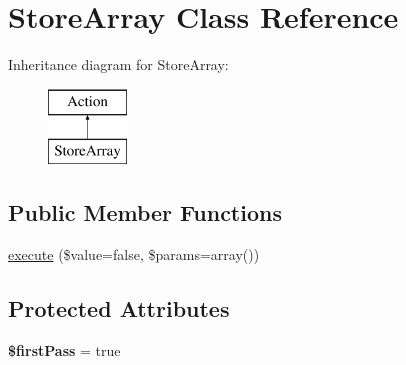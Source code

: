 \hypertarget{class_p_e_a_r2_1_1_console_1_1_command_line_1_1_action_1_1_store_array}{
\section{\-Store\-Array \-Class \-Reference}
\label{class_p_e_a_r2_1_1_console_1_1_command_line_1_1_action_1_1_store_array}
}
\-Inheritance diagram for \-Store\-Array\-:\begin{figure}[H]
\begin{center}
\leavevmode
\includegraphics[height=2.000000cm]{class_p_e_a_r2_1_1_console_1_1_command_line_1_1_action_1_1_store_array}
\end{center}
\end{figure}
\subsection*{\-Public \-Member \-Functions}
\begin{DoxyCompactItemize}
\item 
\hyperlink{class_p_e_a_r2_1_1_console_1_1_command_line_1_1_action_1_1_store_array_a37f62eb63fef4cc7c2d5f438190b307a}{execute} (\$value=false, \$params=array())
\end{DoxyCompactItemize}
\subsection*{\-Protected \-Attributes}
\begin{DoxyCompactItemize}
\item 
\hypertarget{class_p_e_a_r2_1_1_console_1_1_command_line_1_1_action_1_1_store_array_a7b07071ecedb1ef64667f9065ace4a14}{
{\bfseries \$first\-Pass} = true}
\label{class_p_e_a_r2_1_1_console_1_1_command_line_1_1_action_1_1_store_array_a7b07071ecedb1ef64667f9065ace4a14}

\end{DoxyCompactItemize}


